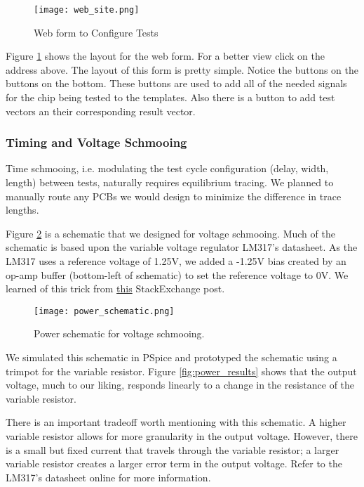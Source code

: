 \begin{figure}[!h]
\texttt{[image: web\_site.png]}
\caption{Web form to Configure Tests}
\label{fig:web_form}
\end{figure}

Figure \ref{fig:web_form} shows the layout for the web form. For a better view click on the address above. The layout of this form is pretty simple. Notice the buttons on the buttons on the bottom. These buttons are used to add all of the needed signals for the chip being tested to the templates. Also there is a button to add test vectors an their corresponding result vector.


\subsubsection{Timing and Voltage Schmooing}
Time schmooing, i.e. modulating the test cycle configuration (delay, width, length) between tests, naturally requires equilibrium tracing. We planned to manually route any PCBs we would design to minimize the difference in trace lengths.

Figure \ref{fig:power_schematic} is a schematic that we designed for voltage schmooing. Much of the schematic is based upon the variable voltage regulator LM317's datasheet. As the LM317 uses a reference voltage of 1.25V, we added a -1.25V bias created by an op-amp buffer (bottom-left of schematic) to set the reference voltage to 0V. We learned of this trick from  \href{http://electronics.stackexchange.com/questions/186760/why-do-linear-voltage-regulators-have-minimum-output-voltage-0-v}{this} StackExchange post. 

\begin{figure}[!h]
\texttt{[image: power\_schematic.png]}
\caption{Power schematic for voltage schmooing.}
\label{fig:power_schematic}
\end{figure}

We simulated this schematic in PSpice and prototyped the schematic using a trimpot for the variable resistor. Figure \ref{fig:power_results} shows that the output voltage, much to our liking, responds linearly to a change in the resistance of the variable resistor.

There is an important tradeoff worth mentioning with this schematic. A higher variable resistor allows for more granularity in the output voltage. However, there is a small but fixed current that travels through the variable resistor; a larger variable resistor creates a larger error term in the output voltage. Refer to the LM317's datasheet online for more information.

